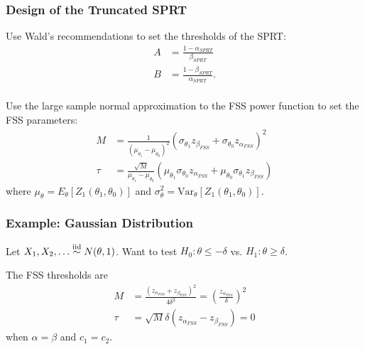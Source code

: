 \documentclass[10pt]{beamer}
\begin{document}
\begin{frame}
\frametitle{Design of the Truncated SPRT}

Use Wald's recommendations to set the thresholds of the SPRT:
\[
\begin{split}
A &= \frac{1 - \alpha_{SPRT}}{\beta_{SPRT}} \\
B &= \frac{1 - \beta_{SPRT}}{\alpha_{SPRT}}. \\
\end{split}
\]

Use the large sample normal approximation to the FSS power function to set the FSS parameters:
\[
\begin{split}
M &= \frac{1}{(\mu_{\theta_1} - \mu_{\theta_0})^2} \left(\sigma_{\theta_1} z_{\beta_{FSS}} + \sigma_{\theta_0} z_{\alpha_{FSS}}\right)^2 \\
\tau &= \frac{\sqrt{M}}{\mu_{\theta_1} - \mu_{\theta_0}} \left(\mu_{\theta_1} \sigma_{\theta_0} z_{\alpha_{FSS}} + \mu_{\theta_0} \sigma_{\theta_1} z_{\beta_{FSS}}\right)
\end{split}
\]
where $\mu_{\theta} = E_{\theta}\left[Z_1(\theta_1, \theta_0)\right]$ and $\sigma^2_{\theta} = \text{Var}_{\theta}\left[Z_1(\theta_1, \theta_0)\right]$.

\end{frame}

\begin{frame}
\frametitle{Example: Gaussian Distribution}

Let $X_1, X_2, \dots  \overset{\text{iid}}\sim N(\theta, 1)$. Want to test $H_0: \theta \leq -\delta$ vs. $H_1: \theta \geq \delta$.

The FSS thresholds are
\[
\begin{split}
M &= \frac{(z_{\alpha_{FSS}} + z_{\beta_{FSS}})^2}{4 \delta^2} = \left(\frac{z_{\alpha_{FSS}}}{\delta}\right)^2\\
\tau &= \sqrt{M} \delta (z_{\alpha_{FSS}} - z_{\beta_{FSS}}) = 0
\end{split}
\]
when $\alpha = \beta$ and $c_1 = c_2$.

\end{frame}
\end{document}
